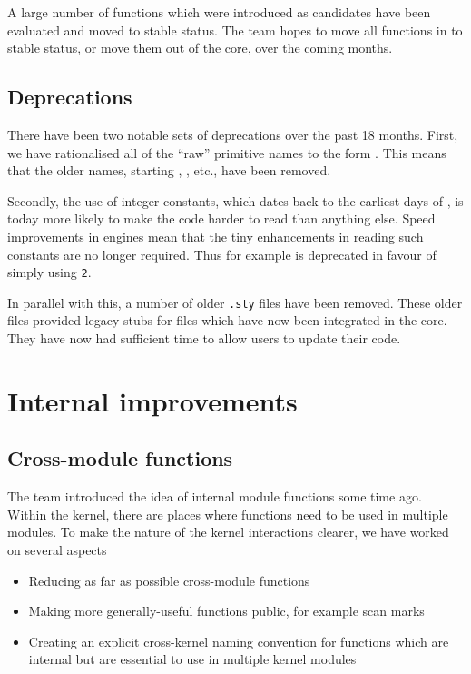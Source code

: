 \documentclass{ltnews}
\begin{document}
A large number of functions which were introduced as candidates have been
evaluated and moved to stable status. The team hopes to move all functions
in  to stable status, or move them out of the core, over the coming
months.

\subsection{Deprecations}

There have been two notable sets of deprecations over the past 18 months.
First, we have rationalised all of the \enquote{raw} primitive names to the
form . This means that the older names, starting
, , etc., have been removed.

Secondly, the use of integer constants, which dates back to the earliest days
of , is today more likely to make the code harder to read than
anything else. Speed improvements in engines mean that the tiny enhancements in
reading such constants are no longer required. Thus for example  is
deprecated in favour of simply using \texttt{2}.

In parallel with this, a number of older \texttt{.sty} files have been removed.
These older files provided legacy stubs for files which have now been
integrated in the  core. They have now had sufficient time to allow
users to update their code.

\section{Internal improvements}

\subsection{Cross-module functions}

The team introduced the idea of internal module functions some time ago. Within
the kernel, there are places where functions need to be used in multiple
modules. To make the nature of the kernel interactions clearer, we have worked
on several aspects
\begin{itemize}
  \item Reducing as far as possible cross-module functions
  \item Making more generally-useful functions public, for example
    scan marks
  \item Creating an explicit cross-kernel naming convention for
    functions which are internal but are essential to use in multiple
    kernel modules
\end{itemize}
\end{document}
